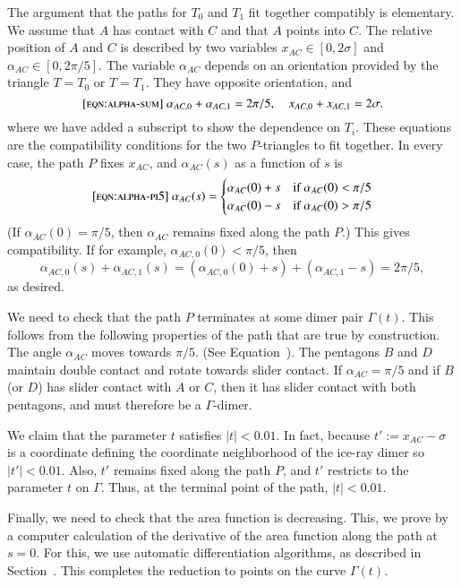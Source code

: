 The argument that the paths for $T_0$ and $T_1$ fit together
compatibly is elementary.  We assume that $A$ has contact with $C$ and
that $A$ points into $C$.  The relative position of $A$ and $C$ is
described by two variables $x_{AC}\in[0,2\sigma]$ and
$\alpha_{AC}\in[0,2\pi/5]$.  The variable $\alpha_{AC}$ depends on an
orientation provided by the triangle $T=T_0$ or $T=T_1$.  They have
opposite orientation, and
\begin{equation}\libel{eqn:alpha-sum}
\alpha_{AC,0}+\alpha_{AC,1} = 2\pi/5,\quad x_{AC,0} + x_{AC,1} = 2\sigma.
\end{equation}
where we have added a subscript to show the dependence on $T_i$.
These equations are the compatibility conditions for the two
$P$-triangles to fit together.  In every case, the path $P$ fixes
$x_{AC}$, and $\alpha_{AC}(s)$ as a function of $s$ is
\begin{equation}\libel{eqn:alpha-pi5}
\alpha_{AC}(s) = 
\begin{cases}
\alpha_{AC}(0) + s&\text{if } \alpha_{AC}(0) < \pi/5\\
\alpha_{AC}(0) - s&\text{if } \alpha_{AC}(0) > \pi/5\\
\end{cases}
\end{equation}
(If $\alpha_{AC}(0) = \pi/5$, then $\alpha_{AC}$ remains fixed along
the path $P$.)  This gives compatibility. If for example,
$\alpha_{AC,0}(0) < \pi/5$, then
\[
\alpha_{AC,0}(s) + \alpha_{AC,1}(s) 
= (\alpha_{AC,0}(0) + s) + (\alpha_{AC,1} - s) = 2\pi/5,
\]
as desired.

We need to check that the path $P$ terminates at some dimer pair
$\Gamma(t)$.  This follows from the following properties of the path
that are true by construction.  The angle $\alpha_{AC}$ moves towards
$\pi/5$. (See Equation~). The pentagons $B$ and $D$
maintain double contact and rotate towards slider contact.  If
$\alpha_{AC}=\pi/5$ and if $B$ (or $D$) has slider contact with $A$ or
$C$, then it has slider contact with both pentagons, and must
therefore be a $\Gamma$-dimer.

We claim that the parameter $t$ satisfies $|t|<0.01$.  In fact,
because $t' := x_{AC}-\sigma$ is a coordinate defining the coordinate
neighborhood of the ice-ray dimer so $|t'|<0.01$.  Also, $t'$ remains
fixed along the path $P$, and $t'$ restricts to the parameter $t$ on
$\Gamma$.  Thus, at the terminal point of the path, $|t|<0.01$.

Finally, we need to check that the area function is decreasing. This,
we prove by a computer calculation of the derivative of the area
function along the path at $s=0$.  For this, we use automatic
differentiation algorithms, as described in
Section~.  This completes the reduction to points
on the curve $\Gamma(t)$.


